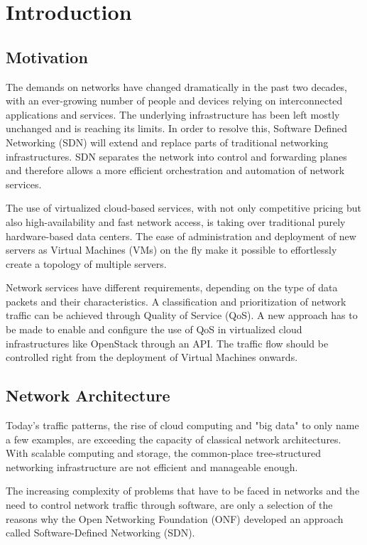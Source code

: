 \chapter{Introduction}
\label{chapter_introduction}



\section{Motivation}

The demands on networks have changed dramatically in the past two decades, with an ever-growing number of people and devices relying on interconnected applications and services. The underlying infrastructure has been left mostly unchanged and is reaching its limits. In order to resolve this, Software Defined Networking (SDN) will extend and replace parts of traditional networking infrastructures. SDN separates the network into control and forwarding planes and therefore allows a more efficient orchestration and automation of network services.

The use of virtualized cloud-based services, with not only competitive pricing but also high-availability and fast network access,  is taking over traditional purely hardware-based data centers. The ease of administration and deployment of new servers as Virtual Machines (VMs) on the fly make it possible to effortlessly create a topology of multiple servers.

Network services have different requirements, depending on the type of data packets and their characteristics. A classification and prioritization of network traffic can be achieved through Quality of Service (QoS). A new approach has to be made to enable and configure the use of QoS in virtualized cloud infrastructures like OpenStack through an API. The traffic flow should be controlled right from the deployment of Virtual Machines onwards.


\section{Network Architecture}
Today's traffic patterns, the rise of cloud computing and "big data" to only name a few examples, are exceeding the capacity of classical network architectures. With scalable computing and storage, the common-place tree-structured networking infrastructure are not efficient and manageable enough. 

The increasing complexity of problems that have to be faced in networks and the need to control network traffic through software, are only a selection of the reasons why the Open Networking Foundation (ONF) developed an approach called Software-Defined Networking (SDN).

